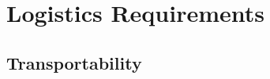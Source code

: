 \KNEADSECTIONNEWPAGE
\section{Logistics Requirements}
\label{lab:sec_Logistics}
% 



% 


\KNEADSUBSECTIONNEWPAGE
\subsection{Transportability}
\label{lab:ssec_Logistics_Transportability}





